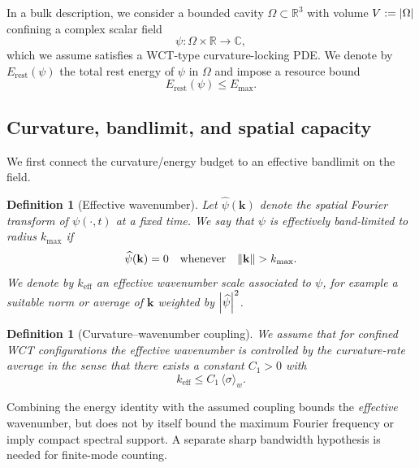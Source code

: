\documentclass[12pt]{article}
\newtheorem{definition}[theorem]{Definition}
\begin{document}
In a bulk description, we consider a bounded cavity $\Omega \subset \mathbb{R}^3$ with volume $V := \abs{\Omega}$ confining a complex scalar field
\[
\psi : \Omega \times \mathbb{R} \to \mathbb{C},
\]
which we assume satisfies a WCT-type curvature-locking PDE. We denote by $E_{\mathrm{rest}}(\psi)$ the total rest energy of $\psi$ in $\Omega$ and impose a resource bound
\begin{equation}
  \label{eq:energy_budget}
  E_{\mathrm{rest}}(\psi) \le E_{\max}.
\end{equation}

\subsection{Curvature, bandlimit, and spatial capacity}

We first connect the curvature/energy budget to an effective bandlimit on the field.

\begin{definition}[Effective wavenumber]
\label{def:effective_k}
Let $\widehat{\psi}(\mathbf{k})$ denote the spatial Fourier transform of $\psi(\cdot,t)$ at a fixed time. We say that $\psi$ is \emph{effectively band-limited} to radius $k_{\max}$ if
\begin{equation}
  \widehat{\psi}(\mathbf{k}) = 0
  \quad\text{whenever}\quad
  \norm{\mathbf{k}} > k_{\max}.
\end{equation}
We denote by $k_{\mathrm{eff}}$ an effective wavenumber scale associated to $\psi$, for example a suitable norm or average of $\mathbf{k}$ weighted by $\abs{\widehat{\psi}}^2$.
\end{definition}

\begin{definition}[Curvature--wavenumber coupling]
\label{def:curvature_k_coupling}
We assume that for confined WCT configurations the effective wavenumber is controlled by the curvature-rate average in the sense that there exists a constant $C_1 > 0$ with
\begin{equation}
  \label{eq:curvature_k_coupling}
  k_{\mathrm{eff}} \le C_1 \,\langle \sigma \rangle_w.
\end{equation}
\end{definition}

Combining the energy identity with the assumed coupling bounds the
\emph{effective} wavenumber, but does not by itself bound the maximum
Fourier frequency or imply compact spectral support. A separate sharp
bandwidth hypothesis is needed for finite-mode counting.
\end{document}
